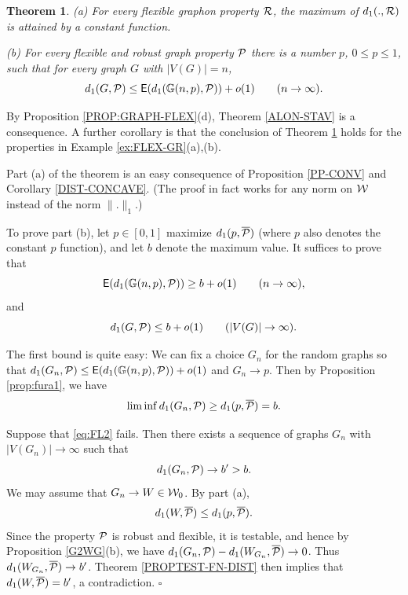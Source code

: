 \documentclass{article}
\newtheorem{theorem}{Theorem}[section]
\newenvironment{proof}{\medskip\noindent{\bf Proof. }}{\hfill$\square$\medskip}
\begin{document}
\begin{theorem}\label{ALON-STAV-FN}
{\rm (a)} For every flexible graphon property $\mathcal{R}$, the maximum of
$d_1(.,\mathcal{R})$ is attained by a constant function.

\smallskip

{\rm (b)} For every flexible and robust graph property $\mathcal{P}$ there is
a number $p$, $0\le p\le 1$, such that for every graph $G$ with
$|V(G)|=n$,
\[
d_1(G,\mathcal{P})\le {\sf E}(d_1({\mathbb G}(n,p),\mathcal{P})) + o(1) \qquad (n\to\infty).
\]
\end{theorem}

By Proposition \ref{PROP:GRAPH-FLEX}(d), Theorem \ref{ALON-STAV} is a
consequence. A further corollary is that the conclusion of Theorem
\ref{ALON-STAV-FN} holds for the properties in Example
\ref{ex:FLEX-GR}(a),(b).

\begin{proof}
Part (a) of the theorem is an easy consequence of Proposition
\ref{PP-CONV} and Corollary \ref{DIST-CONCAVE}. (The proof in fact
works for any norm on $\mathcal{W}$ instead of the norm $\|.\|_1$.)

To prove part (b), let $p\in[0,1]$ maximize $d_1(p,\overline{\mathcal{P}})$
(where $p$ also denotes the constant $p$ function), and let $b$
denote the maximum value. It suffices to prove that
\begin{equation}\label{eq:FL1}
{\sf E}(d_1({\mathbb G}(n,p),\mathcal{P}))\ge b + o(1) \qquad (n\to\infty),
\end{equation}
and
\begin{equation}\label{eq:FL2}
d_1(G,\mathcal{P}) \le b + o(1)\qquad (|V(G)|\to\infty).
\end{equation}

The first bound is quite easy: We can fix a choice $G_n$ for the
random graphs so that $d_1(G_n,\mathcal{P}) \le {\sf E}(d_1({\mathbb G}(n,p),\mathcal{P}))+o(1)$
and $G_n\to p$. Then by Proposition \ref{prop:fura1}, we have
\[
\liminf d_1(G_n,\mathcal{P}) \ge d_1(p,\overline{\mathcal{P}}) = b.
\]

Suppose that \eqref{eq:FL2} fails. Then there exists a sequence of
graphs $G_n$ with $|V(G_n)|\to\infty$ such that
\[
d_1(G_n,\mathcal{P})\to b'>b.
\]
We may assume that $G_n\to W\in\mathcal{W}_0$. By part (a),
\[
d_1(W,\overline{\mathcal{P}}) \le d_1(p,\overline{\mathcal{P}}).
\]
Since the property $\mathcal{P}$ is robust and flexible, it is testable, and
hence by Proposition \ref{G2WG}(b), we have $d_1(G_n,\mathcal{P})
-d_1(W_{G_n},\overline{\mathcal{P}})\to 0$. Thus
$d_1(W_{G_n},\overline{\mathcal{P}})\to b'$. Theorem \ref{PROPTEST-FN-DIST}
then implies that $d_1(W,\overline{\mathcal{P}})=b'$, a contradiction.
\end{proof}
\end{document}
